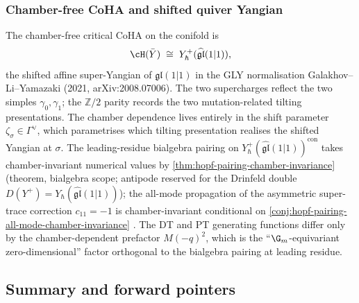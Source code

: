 \subsubsection{Chamber-free CoHA and shifted quiver Yangian}

The chamber-free critical CoHA on the conifold is
\[
 \cH(\bar{Y}) \;\cong\; Y^+_{\hbar}(\widehat{\mathfrak{gl}}(1|1)),
\]
the shifted affine super-Yangian of $\mathfrak{gl}(1|1)$ in the GLY
normalisation Galakhov--Li--Yamazaki (2021, arXiv:2008.07006). The two supercharges
reflect the two simples $\gamma_0, \gamma_1$; the $\mathbb Z/2$ parity
records the two mutation-related tilting presentations. The chamber
dependence lives entirely in the shift parameter
$\zeta_\sigma \in \Gamma^\vee$, which parametrises which tilting
presentation realises the shifted Yangian at $\sigma$. The leading-residue
bialgebra pairing on
$Y^+_{\hbar}(\widehat{\mathfrak{gl}}(1|1))^{\mathrm{con}}$ takes
chamber-invariant numerical values by
\cref{thm:hopf-pairing-chamber-invariance} (theorem, bialgebra
scope; antipode reserved for the Drinfeld double
$D(Y^+) = Y_{\hbar}(\widehat{\mathfrak{gl}}(1|1))$); the all-mode propagation
of the asymmetric super-trace correction $c_{11} = -1$ is chamber-invariant
conditional on \cref{conj:hopf-pairing-all-mode-chamber-invariance}
. The DT and PT generating functions differ only by the
chamber-dependent prefactor $M(-q)^2$, which is the
``$\G_m$-equivariant zero-dimensional'' factor orthogonal to the
bialgebra pairing at leading residue.

\subsection{Summary and forward pointers}
\label{sec:wc-summary}

